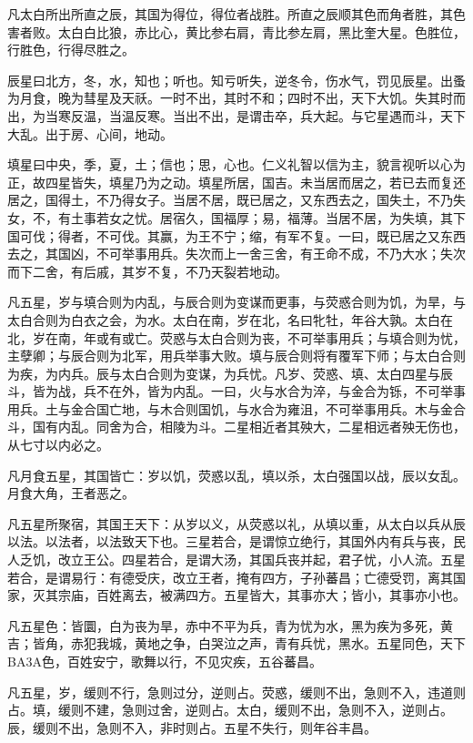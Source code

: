 \documentclass[]{article}
\begin{document}
凡太白所出所直之辰，其国为得位，得位者战胜。所直之辰顺其色而角者胜，其色害者败。太白白比狼，赤比心，黄比参右肩，青比参左肩，黑比奎大星。色胜位，行胜色，行得尽胜之。

辰星曰北方，冬，水，知也；听也。知亏听失，逆冬令，伤水气，罚见辰星。出蚤为月食，晚为彗星及天祅。一时不出，其时不和；四时不出，天下大饥。失其时而出，为当寒反温，当温反寒。当出不出，是谓击卒，兵大起。与它星遇而斗，天下大乱。出于房、心间，地动。

填星曰中央，季，夏，土；信也；思，心也。仁义礼智以信为主，貌言视听以心为正，故四星皆失，填星乃为之动。填星所居，国吉。未当居而居之，若已去而复还居之，国得土，不乃得女子。当居不居，既已居之，又东西去之，国失土，不乃失女，不，有土事若女之忧。居宿久，国福厚；易，福薄。当居不居，为失填，其下国可伐；得者，不可伐。其赢，为王不宁；缩，有军不复。一曰，既已居之又东西去之，其国凶，不可举事用兵。失次而上一舍三舍，有王命不成，不乃大水；失次而下二舍，有后戚，其岁不复，不乃天裂若地动。

凡五星，岁与填合则为内乱，与辰合则为变谋而更事，与荧惑合则为饥，为旱，与太白合则为白衣之会，为水。太白在南，岁在北，名曰牝牡，年谷大孰。太白在北，岁在南，年或有或亡。荧惑与太白合则为丧，不可举事用兵；与填合则为忧，主孽卿；与辰合则为北军，用兵举事大败。填与辰合则将有覆军下师；与太白合则为疾，为内兵。辰与太白合则为变谋，为兵忧。凡岁、荧惑、填、太白四星与辰斗，皆为战，兵不在外，皆为内乱。一曰，火与水合为淬，与金合为铄，不可举事用兵。土与金合国亡地，与木合则国饥，与水合为雍沮，不可举事用兵。木与金合斗，国有内乱。同舍为合，相陵为斗。二星相近者其殃大，二星相远者殃无伤也，从七寸以内必之。

凡月食五星，其国皆亡：岁以饥，荧惑以乱，填以杀，太白强国以战，辰以女乱。月食大角，王者恶之。

凡五星所聚宿，其国王天下：从岁以义，从荧惑以礼，从填以重，从太白以兵从辰以法。以法者，以法致天下也。三星若合，是谓惊立绝行，其国外内有兵与丧，民人乏饥，改立王公。四星若合，是谓大汤，其国兵丧并起，君子忧，小人流。五星若合，是谓易行：有德受庆，改立王者，掩有四方，子孙蕃昌；亡德受罚，离其国家，灭其宗庙，百姓离去，被满四方。五星皆大，其事亦大；皆小，其事亦小也。

凡五星色：皆圜，白为丧为旱，赤中不平为兵，青为忧为水，黑为疾为多死，黄吉；皆角，赤犯我城，黄地之争，白哭泣之声，青有兵忧，黑水。五星同色，天下BA3A色，百姓安宁，歌舞以行，不见灾疾，五谷蕃昌。

凡五星，岁，缓则不行，急则过分，逆则占。荧惑，缓则不出，急则不入，违道则占。填，缓则不建，急则过舍，逆则占。太白，缓则不出，急则不入，逆则占。辰，缓则不出，急则不入，非时则占。五星不失行，则年谷丰昌。
\end{document}

